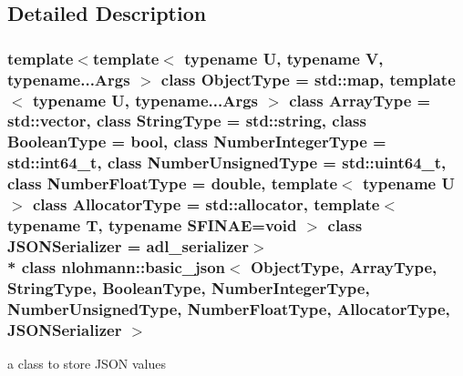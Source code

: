 \subsection{Detailed Description}
\subsubsection*{template$<$template$<$ typename U, typename V, typename...\+Args $>$ class Object\+Type = std\+::map, template$<$ typename U, typename...\+Args $>$ class Array\+Type = std\+::vector, class String\+Type = std\+::string, class Boolean\+Type = bool, class Number\+Integer\+Type = std\+::int64\+\_\+t, class Number\+Unsigned\+Type = std\+::uint64\+\_\+t, class Number\+Float\+Type = double, template$<$ typename U $>$ class Allocator\+Type = std\+::allocator, template$<$ typename T, typename S\+F\+I\+N\+A\+E=void $>$ class J\+S\+O\+N\+Serializer = adl\+\_\+serializer$>$\\*
class nlohmann\+::basic\+\_\+json$<$ Object\+Type, Array\+Type, String\+Type, Boolean\+Type, Number\+Integer\+Type, Number\+Unsigned\+Type, Number\+Float\+Type, Allocator\+Type, J\+S\+O\+N\+Serializer $>$}

a class to store J\+S\+ON values 


